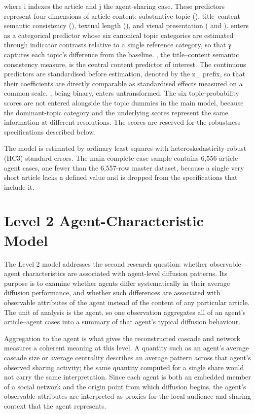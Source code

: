 where i indexes the article and j the agent-sharing case. These predictors represent four dimensions of article content: substantive topic (), title–content semantic consistency (), textual length (), and visual presentation ( and ).  enters as a categorical predictor whose six canonical topic categories are estimated through indicator contrasts relative to a single reference category, so that γ captures each topic's difference from the baseline. , the title–content semantic consistency measure, is the central content predictor of interest. The continuous predictors are standardised before estimation, denoted by the z\_ prefix, so that their coefficients are directly comparable as standardised effects measured on a common scale. , being binary, enters untransformed. The six topic-probability scores are not entered alongside the topic dummies in the main model, because the dominant-topic category and the underlying scores represent the same information at different resolutions. The scores are reserved for the robustness specifications described below.

The model is estimated by ordinary least squares with heteroskedasticity-robust (HC3) standard errors. The main complete-case sample contains 6,556 article–agent cases, one fewer than the 6,557-row master dataset, because a single very short article lacks a defined  value and is dropped from the specifications that include it.

\section{Level 2 Agent-Characteristic Model}
\label{sec:5-2-level-2-agent-characteristic-model}

The Level 2 model addresses the second research question: whether observable agent characteristics are associated with agent-level diffusion patterns. Its purpose is to examine whether agents differ systematically in their average diffusion performance, and whether such differences are associated with observable attributes of the agent instead of the content of any particular article. The unit of analysis is the agent, so one observation aggregates all of an agent's article–agent cases into a summary of that agent's typical diffusion behaviour.

Aggregation to the agent is what gives the reconstructed cascade and network measures a coherent meaning at this level. A quantity such as an agent's average cascade size or average centrality describes an average pattern across that agent's observed sharing activity; the same quantity computed for a single share would not carry the same interpretation. Since each agent is both an embedded member of a social network and the origin point from which diffusion begins, the agent's observable attributes are interpreted as proxies for the local audience and sharing context that the agent represents.

